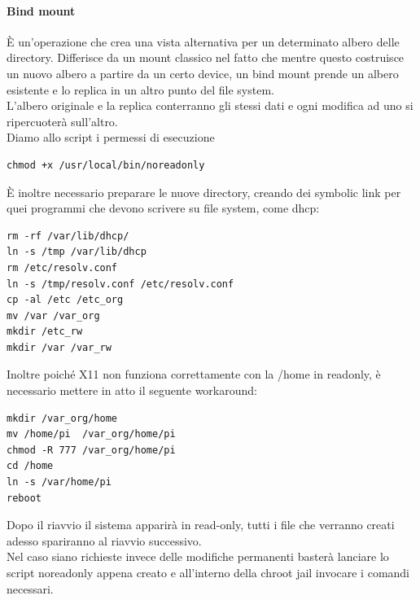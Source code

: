 \paragraph{Bind mount}
È un'operazione che crea una vista alternativa per un determinato albero delle directory. Differisce da un mount classico nel fatto che mentre questo costruisce un nuovo albero a partire da un certo device, un bind mount prende un albero esistente e lo replica in un altro punto del file system.\\
L'albero originale e la replica conterranno gli stessi dati e ogni modifica ad uno si ripercuoterà sull'altro.\\

\noindent Diamo allo script i permessi di esecuzione
\begin{lstlisting}
chmod +x /usr/local/bin/noreadonly
\end{lstlisting}


\noindent È inoltre necessario preparare le nuove directory, creando dei symbolic link per quei programmi che devono scrivere su file system, come dhcp: %

\begin{lstlisting}
rm -rf /var/lib/dhcp/
ln -s /tmp /var/lib/dhcp
rm /etc/resolv.conf
ln -s /tmp/resolv.conf /etc/resolv.conf
cp -al /etc /etc_org
mv /var /var_org
mkdir /etc_rw
mkdir /var /var_rw

\end{lstlisting}

\noindent Inoltre poiché X11 non funziona correttamente con la /home in readonly, è necessario mettere in atto il seguente workaround:

\begin{lstlisting}
mkdir /var_org/home
mv /home/pi  /var_org/home/pi
chmod -R 777 /var_org/home/pi
cd /home
ln -s /var/home/pi
reboot
\end{lstlisting}

Dopo il riavvio il sistema apparirà in read-only, tutti i file che verranno creati adesso spariranno al riavvio successivo.\\
Nel caso siano richieste invece delle modifiche permanenti basterà lanciare lo script noreadonly appena creato e all'interno della chroot jail invocare i comandi necessari.
